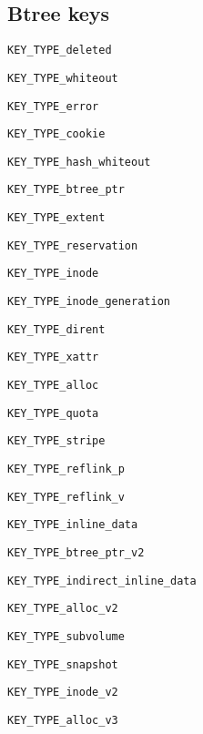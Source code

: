\documentclass{article}
\begin{document}
\subsection{Btree keys}

\begin{description}
	\item \texttt{KEY\_TYPE\_deleted}
	\item \texttt{KEY\_TYPE\_whiteout}
	\item \texttt{KEY\_TYPE\_error}
	\item \texttt{KEY\_TYPE\_cookie}
	\item \texttt{KEY\_TYPE\_hash\_whiteout}
	\item \texttt{KEY\_TYPE\_btree\_ptr}
	\item \texttt{KEY\_TYPE\_extent}
	\item \texttt{KEY\_TYPE\_reservation}
	\item \texttt{KEY\_TYPE\_inode}
	\item \texttt{KEY\_TYPE\_inode\_generation}
	\item \texttt{KEY\_TYPE\_dirent}
	\item \texttt{KEY\_TYPE\_xattr}
	\item \texttt{KEY\_TYPE\_alloc}
	\item \texttt{KEY\_TYPE\_quota}
	\item \texttt{KEY\_TYPE\_stripe}
	\item \texttt{KEY\_TYPE\_reflink\_p}
	\item \texttt{KEY\_TYPE\_reflink\_v}
	\item \texttt{KEY\_TYPE\_inline\_data}
	\item \texttt{KEY\_TYPE\_btree\_ptr\_v2}
	\item \texttt{KEY\_TYPE\_indirect\_inline\_data}
	\item \texttt{KEY\_TYPE\_alloc\_v2}
	\item \texttt{KEY\_TYPE\_subvolume}
	\item \texttt{KEY\_TYPE\_snapshot}
	\item \texttt{KEY\_TYPE\_inode\_v2}
	\item \texttt{KEY\_TYPE\_alloc\_v3}
\end{description}
\end{document}
